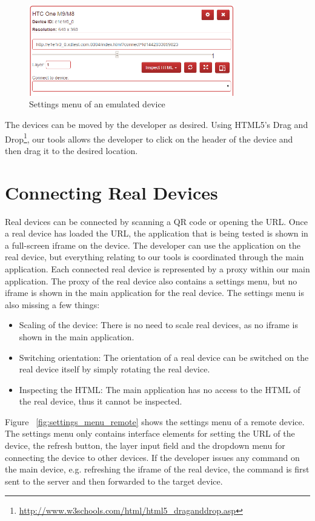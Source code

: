 \begin{figure}[H]
  \centering
    \includegraphics[width=0.8\textwidth]{images/screenshots/settings_menu_2.png}
	\caption{Settings menu of an emulated device}
	\label{fig:settings_menu}
\end{figure}

The devices can be moved by the developer as desired. Using HTML5's Drag and Drop\footnote{\url{http://www.w3schools.com/html/html5_draganddrop.asp}}, our tools allows the developer to click on the header of the device and then drag it to the desired location. 

\section{Connecting Real Devices}

Real devices can be connected by scanning a QR code or opening the URL. Once a real device has loaded the URL, the application that is being tested is shown in a full-screen iframe on the device. The developer can use the application on the real device, but everything relating to our tools is coordinated through the main application. Each connected real device is represented by a proxy within our main application. The proxy of the real device also contains a settings menu, but no iframe is shown in the main application for the real device. The settings menu is also missing a few things:
\begin{itemize}
	\item Scaling of the device: There is no need to scale real devices, as no iframe is shown in the main application.
	\item Switching orientation: The orientation of a real device can be switched on the real device itself by simply rotating the real device.
	\item Inspecting the HTML: The main application has no access to the HTML of the real device, thus it cannot be inspected.
\end{itemize}
Figure ~\ref{fig:settings_menu_remote} shows the settings menu of a remote device. The settings menu only contains interface elements for setting the URL of the device, the refresh button, the layer input field and the dropdown menu for connecting the device to other devices. If the developer issues any command on the main device, e.g. refreshing the iframe of the real device, the command is first sent to the server and then forwarded to the target device. 

